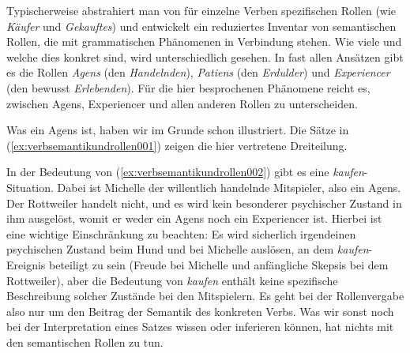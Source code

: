 Typischerweise abstrahiert man von für einzelne Verben spezifischen Rollen (wie \textit{Käufer} und \textit{Gekauftes}) und entwickelt ein reduziertes Inventar von semantischen Rollen, die mit grammatischen Phänomenen in Verbindung stehen.
Wie viele und welche dies konkret sind, wird unterschiedlich gesehen.
In fast allen Ansätzen gibt es die Rollen \textit{Agens} (den \textit{Handelnden}), \textit{Patiens} (den \textit{Erdulder}) und \textit{Experiencer} (den bewusst \textit{Erlebenden}).
Für die hier besprochenen Phänomene reicht es, zwischen Agens, Experiencer und allen anderen Rollen zu unterscheiden.

Was ein Agens ist, haben wir im Grunde schon illustriert.
Die Sätze in (\ref{ex:verbsemantikundrollen001}) zeigen die hier vertretene Dreiteilung.

\begin{exe}
  \ex\label{ex:verbsemantikundrollen001}
  \begin{xlist}
  \end{xlist}
\end{exe}

In der Bedeutung von (\ref{ex:verbsemantikundrollen002}) gibt es eine \textit{kaufen}-Situation.
Dabei ist Michelle der willentlich handelnde Mitspieler, also ein Agens.
Der Rottweiler handelt nicht, und es wird kein besonderer psychischer Zustand in ihm ausgelöst, womit er weder ein Agens noch ein Experiencer ist.
Hierbei ist eine wichtige Einschränkung zu beachten: Es wird sicherlich irgendeinen psychischen Zustand beim Hund und bei Michelle auslösen, an dem \textit{kaufen}-Ereignis beteiligt zu sein (\zB Freude bei Michelle und anfängliche Skepsis bei dem Rottweiler), aber die Bedeutung von \textit{kaufen} enthält keine spezifische Beschreibung solcher Zustände bei den Mitspielern.
Es geht bei der Rollenvergabe also nur um den Beitrag der Semantik des konkreten Verbs.
Was wir sonst noch bei der Interpretation eines Satzes wissen oder inferieren können, hat nichts mit den semantischen Rollen zu tun.

